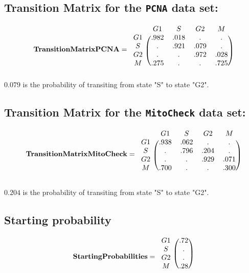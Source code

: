 \documentclass{article}
\begin{document}
\subsection{Transition Matrix for the \texttt{PCNA} data set:}
\[
  \mathbf{Transition Matrix PCNA} = 
    \begin{blockarray}{ccccc}
        & G1 & S & G2 & M\\
      \begin{block}{c(cccc)}
        G1 & .982 & .018 & .    & .  \\
        S  & .    & .921 & .079 & .  \\
        G2 & .    & .    & .972 & .028\\
        M  & .275 & .    & .    & .725\\
      \end{block}
    \end{blockarray}
\]
$0.079$ is the probability of transiting from state "S" to state "G2".

\subsection{Transition Matrix for the \texttt{MitoCheck} data set:}

\[
  \mathbf{Transition Matrix MitoCheck} = 
    \begin{blockarray}{ccccc}
        & G1 & S & G2 & M\\
      \begin{block}{c(cccc)}
        G1 & .938 & .062 & .    & .   \\
        S  & .    & .796 & .204 & .   \\
        G2 & .    & .    & .929 & .071\\
        M  & .700 & .    & .    & .300\\
      \end{block}
    \end{blockarray}
\]

$0.204$ is the probability of transiting from state "S" to state "G2".

\subsection{Starting probability}
\[
  \mathbf{Starting Probabilities} = 
    \begin{blockarray}{cc}
      \begin{block}{c(c)}
        G1 & .72   \\
        S  & .   \\
        G2 & .   \\
        M  & .28   \\
      \end{block}
    \end{blockarray}
\]
\end{document}
